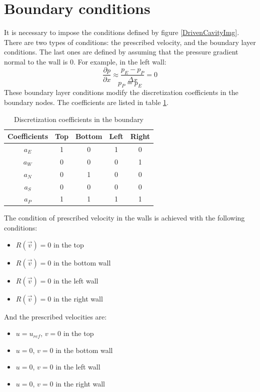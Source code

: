 \section{Boundary conditions}
It is necessary to impose the conditions defined by figure \ref{DrivenCavityImg}. There are two types of conditions: the prescribed velocity, and the boundary layer conditions. The last ones are defined by assuming that the pressure gradient normal to the wall is 0. For example, in the left wall:
\begin{equation}
	\frac{\partial p}{\partial x}\approx\frac{p_{E}-p_{P}}{\Delta x}=0
\end{equation}
\begin{equation}
p_{P}=p_{E}
\end{equation}
These boundary layer conditions modify the discretization coefficients in the boundary nodes. The coefficients are listed in table \ref{DCBoundaryCoefficients}.
\begin{table}[h]
	\centering
	\begin{tabular}{ |c|c|c|c|c| }
		\hline
		Coefficients & Top & Bottom & Left & Right \\ \hline
		$a_{E}$ & 1 & 0 & 1 & 0 \\ \hline
		$a_{W}$ & 0 & 0 & 0 & 1 \\ \hline
		$a_{N}$ & 0 & 1 & 0 & 0 \\ \hline
		$a_{S}$ & 0 & 0 & 0 & 0 \\ \hline
		$a_{P}$ & 1 & 1 & 1 & 1 \\ \hline
	\end{tabular}
\caption{Discretization coefficients in the boundary}
\label{DCBoundaryCoefficients}
\end{table}

The condition of prescribed velocity in the walls is achieved with the following conditions:
\begin{itemize}
	\item $R\left(\vec{v}\right)=0$ in the top
	\item $R\left(\vec{v}\right)=0$ in the bottom wall
	\item $R\left(\vec{v}\right)=0$ in the left wall
	\item $R\left(\vec{v}\right)=0$ in the right wall
\end{itemize}
And the prescribed velocities are:
\begin{itemize}
	\item $u=u_{ref}$, $v=0$ in the top
	\item $u=0$, $v=0$ in the bottom wall
	\item $u=0$, $v=0$ in the left wall
	\item $u=0$, $v=0$ in the right wall
\end{itemize}

